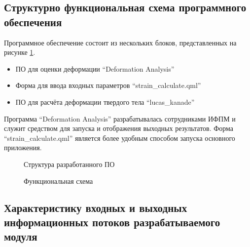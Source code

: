 \subsection{Структурно функциональная схема программного обеспечения}%

Программное обеспечение состоит из нескольких блоков, представленных на рисунке \ref{pic:shema_PO}.

\begin{itemize}
\item ПО для оценки деформации ``Deformation Analysis''
\item Форма для ввода входных параметров ``strain\_calculate.qml''
\item ПО для расчёта деформации твердого тела ``lucas\_kanade''
\end{itemize}

Программа ``Deformation Analysis'' разрабатывалась сотрудниками ИФПМ и служит средством для запуска и отображения выходных результатов. Форма ``strain\_calculate.qml'' является более удобным способом запуска основного приложения. 

\begin{figure}[ht]
\caption{Структура разработанного ПО}
\label{pic:shema_PO}
\end{figure}

\begin{figure}[ht]
\caption{Функциональная схема}
\label{pic:idef0}
\end{figure}

\subsection{Характеристику входных и выходных информационных потоков разрабатываемого модуля}


